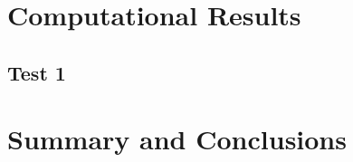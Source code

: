 \documentclass[twoside,twocolumn]{article}
\begin{document}

    \section{Computational Results}
    \subsection{Test 1}
        

    \section{Summary and Conclusions}
    

    \mbox{~}
    \clearpage
    \begin{appendices}
    \end{appendices}
\end{document}
